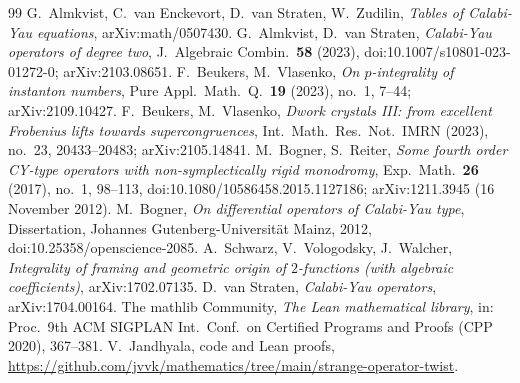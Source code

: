 \documentclass[11pt]{amsart}
\theoremstyle{definition}
\theoremstyle{remark}
\begin{document}
\begin{thebibliography}{99}
 G.~Almkvist, C.~van Enckevort, D.~van Straten, W.~Zudilin, \emph{Tables of
Calabi-Yau equations}, arXiv:math/0507430.
 G.~Almkvist, D.~van Straten, \emph{Calabi-Yau operators of degree two}, J.\ Algebraic
Combin.\ \textbf{58} (2023), doi:10.1007/s10801-023-01272-0; arXiv:2103.08651.
 F.~Beukers, M.~Vlasenko, \emph{On $p$-integrality of instanton numbers}, Pure Appl.\
Math.\ Q.\ \textbf{19} (2023), no.~1, 7--44; arXiv:2109.10427.
 F.~Beukers, M.~Vlasenko, \emph{Dwork crystals III: from excellent Frobenius lifts
towards supercongruences}, Int.\ Math.\ Res.\ Not.\ IMRN (2023), no.~23, 20433--20483; arXiv:2105.14841.
\bibitem{BR} M.~Bogner, S.~Reiter, \emph{Some fourth order CY-type operators with non-symplectically rigid
monodromy}, Exp.\ Math.\ \textbf{26} (2017), no.~1, 98--113, doi:10.1080/10586458.2015.1127186;
arXiv:1211.3945 (16 November 2012).
 M.~Bogner, \emph{On differential operators of Calabi-Yau type}, Dissertation,
Johannes Gutenberg-Universit\"at Mainz, 2012, doi:10.25358/openscience-2085.
\bibitem{SVW} A.~Schwarz, V.~Vologodsky, J.~Walcher, \emph{Integrality of framing and geometric origin of $2$-functions (with algebraic coefficients)}, arXiv:1702.07135.
\bibitem{vS17} D.~van Straten, \emph{Calabi-Yau operators}, arXiv:1704.00164.
\bibitem{mathlib} The mathlib Community, \emph{The Lean mathematical library}, in: Proc.\ 9th ACM SIGPLAN Int.\ Conf.\ on Certified Programs and Proofs (CPP 2020), 367--381.
\bibitem{repo} V.~Jandhyala, code and Lean proofs, \url{https://github.com/jvvk/mathematics/tree/main/strange-operator-twist}.
\end{thebibliography}
\end{document}
